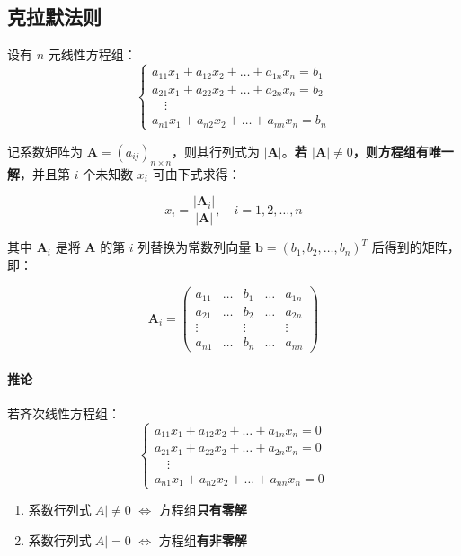 \documentclass[a4paper,12pt]{article}
\begin{document}
    \subsection{克拉默法则}

    设有 $n$ 元线性方程组：
    \[
        \begin{cases}
            a_{11}x_1 + a_{12}x_2 + \dots + a_{1n}x_n = b_1 \\
            a_{21}x_1 + a_{22}x_2 + \dots + a_{2n}x_n = b_2 \\
            \quad \vdots \\
            a_{n1}x_1 + a_{n2}x_2 + \dots + a_{nn}x_n = b_n
        \end{cases}
    \]

    记系数矩阵为 $\mathbf{A} = (a_{ij})_{n\times n}$，则其行列式为 $|\mathbf{A}|$。\textbf{若 $|\mathbf{A}| \neq 0$，则方程组有唯一解}，并且第 $i$ 个未知数 $x_i$ 可由下式求得：

    \[
        x_i = \frac{|\mathbf{A}_i|}{|\mathbf{A}|}, \quad i=1,2,\dots,n
    \]

    其中 $\mathbf{A}_i$ 是将 $\mathbf{A}$ 的第 $i$ 列替换为常数列向量 $\mathbf{b} = (b_1, b_2, \dots, b_n)^T$ 后得到的矩阵，即：

    \[
        \mathbf{A}_i =
        \begin{pmatrix}
            a_{11} & \dots & b_1    & \dots & a_{1n} \\
            a_{21} & \dots & b_2    & \dots & a_{2n} \\
            \vdots &       & \vdots &       & \vdots \\
            a_{n1} & \dots & b_n    & \dots & a_{nn}
        \end{pmatrix}
    \]

    \paragraph{推论} 若齐次线性方程组：
    \[
        \begin{cases}
            a_{11}x_1 + a_{12}x_2 + \dots + a_{1n}x_n = 0 \\
            a_{21}x_1 + a_{22}x_2 + \dots + a_{2n}x_n = 0 \\
            \quad \vdots \\
            a_{n1}x_1 + a_{n2}x_2 + \dots + a_{nn}x_n = 0
        \end{cases}
    \]

    \begin{enumerate}
        \item 系数行列式$|A| \neq 0$ $\Leftrightarrow$ 方程组\textbf{只有零解}
        \item 系数行列式$|A| = 0$ $\Leftrightarrow$ 方程组\textbf{有非零解}
    \end{enumerate}
\end{document}
